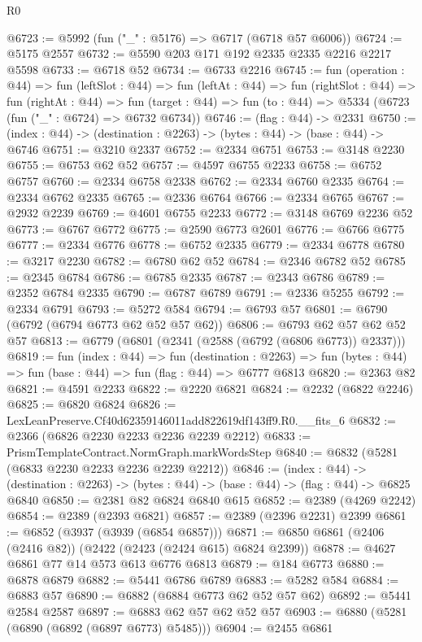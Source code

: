 \begin{lexlean}{R0}
\begin{coremodule}
@6723 := @5992 (fun ("_" : @5176) => @6717 (@6718 @57 @6006))
@6724 := @5175 @2557
@6732 := @5590 @203 @171 @192 @2335 @2335 @2216 @2217 @5598
@6733 := @6718 @52
@6734 := @6733 @2216
@6745 := fun (operation : @44) =>
  fun (leftSlot : @44) =>
  fun (leftAt : @44) =>
  fun (rightSlot : @44) =>
  fun (rightAt : @44) =>
  fun (target : @44) => fun (to : @44) => @5334 (@6723 (fun ("_" : @6724) => @6732 @6734))
@6746 := (flag : @44) -> @2331
@6750 := (index : @44) -> (destination : @2263) -> (bytes : @44) -> (base : @44) -> @6746
@6751 := @3210 @2337
@6752 := @2334 @6751
@6753 := @3148 @2230
@6755 := @6753 @62 @52
@6757 := @4597 @6755 @2233
@6758 := @6752 @6757
@6760 := @2334 @6758 @2338
@6762 := @2334 @6760 @2335
@6764 := @2334 @6762 @2335
@6765 := @2336 @6764
@6766 := @2334 @6765
@6767 := @2932 @2239
@6769 := @4601 @6755 @2233
@6772 := @3148 @6769 @2236 @52
@6773 := @6767 @6772
@6775 := @2590 @6773 @2601
@6776 := @6766 @6775
@6777 := @2334 @6776
@6778 := @6752 @2335
@6779 := @2334 @6778
@6780 := @3217 @2230
@6782 := @6780 @62 @52
@6784 := @2346 @6782 @52
@6785 := @2345 @6784
@6786 := @6785 @2335
@6787 := @2343 @6786
@6789 := @2352 @6784 @2335
@6790 := @6787 @6789
@6791 := @2336 @5255
@6792 := @2334 @6791
@6793 := @5272 @584
@6794 := @6793 @57
@6801 := @6790 (@6792 (@6794 @6773 @62 @52 @57 @62))
@6806 := @6793 @62 @57 @62 @52 @57
@6813 := @6779 (@6801 (@2341 (@2588 (@6792 (@6806 @6773)) @2337)))
@6819 := fun (index : @44) =>
  fun (destination : @2263) =>
  fun (bytes : @44) => fun (base : @44) => fun (flag : @44) => @6777 @6813
@6820 := @2363 @82
@6821 := @4591 @2233
@6822 := @2220 @6821
@6824 := @2232 (@6822 @2246)
@6825 := @6820 @6824
@6826 := LexLeanPreserve.Cf40d62359146011add822619df143ff9.R0.__fits_6
@6832 := @2366 (@6826 @2230 @2233 @2236 @2239 @2212)
@6833 := PrismTemplateContract.NormGraph.markWordsStep
@6840 := @6832 (@5281 (@6833 @2230 @2233 @2236 @2239 @2212))
@6846 := (index : @44) ->
  (destination : @2263) -> (bytes : @44) -> (base : @44) -> (flag : @44) -> @6825 @6840
@6850 := @2381 @82 @6824 @6840 @615
@6852 := @2389 (@4269 @2242)
@6854 := @2389 (@2393 @6821)
@6857 := @2389 (@2396 @2231) @2399
@6861 := @6852 (@3937 (@3939 (@6854 @6857)))
@6871 := @6850 @6861 (@2406 (@2416 @82)) (@2422 (@2423 (@2424 @615) @6824 @2399))
@6878 := @4627 @6861 @77 @14 @573 @613 @6776 @6813
@6879 := @184 @6773
@6880 := @6878 @6879
@6882 := @5441 @6786 @6789
@6883 := @5282 @584
@6884 := @6883 @57
@6890 := @6882 (@6884 @6773 @62 @52 @57 @62)
@6892 := @5441 @2584 @2587
@6897 := @6883 @62 @57 @62 @52 @57
@6903 := @6880 (@5281 (@6890 (@6892 (@6897 @6773) @5485)))
@6904 := @2455 @6861

\end{coremodule}
\end{lexlean}
